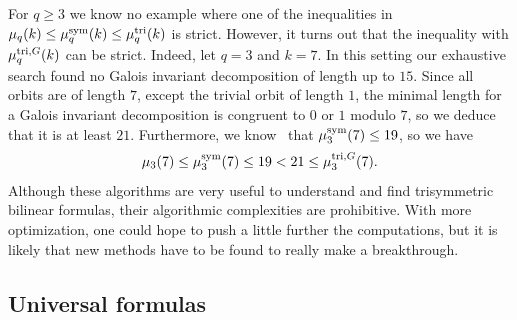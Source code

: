 For $q\geq3$ we know no example where one of the inequalities in
$\mu_q(k)\leq\mu^{\textrm{sym}}_q(k)\leq\mu^{\textrm{tri}}_q(k)$ is strict. However, it turns out that
the inequality with $\mu^{\textrm{tri},G}_q(k)$ can be strict. Indeed, let $q=3$ and $k=7$.
In this setting our exhaustive search found no Galois invariant decomposition of
length up to $15$. Since all orbits are of length $7$, except the trivial orbit
of length $1$, the minimal length for a Galois invariant decomposition is congruent
to $0$ or $1$ modulo $7$, so we deduce that it is at least $21$. Furthermore, we
know~\cite[Table~2]{BCPRRR19} that $\mu^{\textrm{sym}}_3(7)\leq19$, so we have
\[
  \mu_3(7)\leq\mu^{\textrm{sym}}_3(7)\leq 19<21\leq \mu^{\textrm{tri},G}_3(7).
\]
Although these algorithms are very useful to understand and find trisymmetric
bilinear formulas, their algorithmic complexities are prohibitive. With more
optimization, one could hope to push a little further the computations, but it
is likely that new methods have to be found to really make a breakthrough.

\subsection{Universal formulas}


